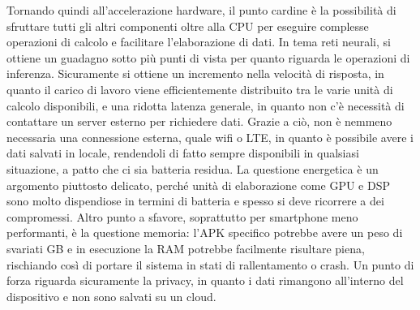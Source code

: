 Tornando quindi all’accelerazione hardware, il punto cardine è la possibilità di sfruttare tutti gli altri componenti oltre alla CPU per eseguire complesse
operazioni di calcolo e facilitare l’elaborazione di dati. 
In tema reti neurali, si ottiene un guadagno sotto più punti di vista per quanto riguarda le operazioni di inferenza. Sicuramente si ottiene un incremento
nella velocità di risposta, in quanto il carico di lavoro viene efficientemente distribuito tra le varie unità di calcolo disponibili, e una ridotta
latenza generale, in quanto non c’è necessità di contattare un server esterno per richiedere dati.
Grazie a ciò, non è nemmeno necessaria una connessione esterna, quale wifi o LTE, in quanto è possibile avere i dati salvati in locale, rendendoli di fatto
sempre disponibili in qualsiasi situazione, a patto che ci sia batteria residua.
La questione energetica è un argomento piuttosto delicato, perché unità di elaborazione come GPU e DSP sono molto dispendiose in termini di batteria e
spesso si deve ricorrere a dei compromessi.
Altro punto a sfavore, soprattutto per smartphone meno performanti, è la questione memoria: l’APK specifico potrebbe avere un peso di svariati GB e in
esecuzione la RAM potrebbe facilmente risultare piena, rischiando così di portare il sistema in stati di rallentamento o crash.
Un punto di forza riguarda sicuramente la privacy, in quanto i dati rimangono all’interno del dispositivo e non sono salvati su un cloud.


